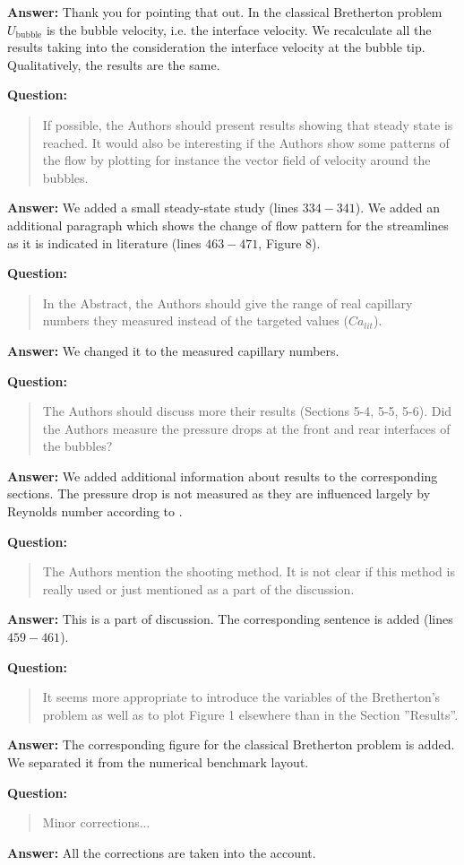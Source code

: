 \documentclass{article}
\begin{document}
\textbf{Answer:} Thank you for pointing that out. In the classical Bretherton problem
$U_{\mathrm{bubble}}$ is the bubble velocity, i.e. the interface velocity. We recalculate all the
results taking into the consideration the interface velocity at the bubble tip. Qualitatively, the
results are the same. 

\textbf{Question:} 
\begin{quotation}
 If possible, the Authors should present results showing that steady state is reached. It would
also
be interesting if the Authors show some patterns of the flow by plotting for instance the vector
ﬁeld
of velocity around the bubbles.
\end{quotation}

\textbf{Answer:} We added a small steady-state study (lines $334-341$). We added an additional
paragraph which shows the change of flow pattern for the
streamlines as it is indicated in literature (lines $463-471$, Figure 8).

\textbf{Question:}
\begin{quotation}
In the Abstract, the Authors should give the range of real capillary numbers they measured instead
of the targeted values ($Ca_{lit}$).
\end{quotation}

\textbf{Answer:} We changed it to the measured capillary numbers.

\textbf{Question:} 
\begin{quotation}
The Authors should discuss more their results (Sections 5-4, 5-5, 5-6). Did the Authors measure the
pressure drops at the front and rear interfaces of the bubbles?
\end{quotation}

\textbf{Answer:} We added additional information about results to the corresponding sections. The
pressure drop is not measured as they are influenced largely by Reynolds number according to
\citet{heil-bretherton}.

\textbf{Question:}
\begin{quotation}
The Authors mention the shooting method. It is not clear if this method is really used or just
mentioned as a part of the discussion.
\end{quotation}

\textbf{Answer:} This is a part of discussion. The corresponding
sentence is added (lines $459-461$).

\textbf{Question:}
\begin{quotation}
It seems more appropriate to introduce the variables of the Bretherton’s problem as well as to plot
Figure 1 elsewhere than in the Section ”Results”.
\end{quotation}

\textbf{Answer:} The corresponding figure for the classical Bretherton problem is added. We
separated it from the numerical benchmark layout.

\textbf{Question:}
\begin{quotation}
Minor corrections...
\end{quotation}

\textbf{Answer:} All the corrections are taken into the account.



\end{document}
